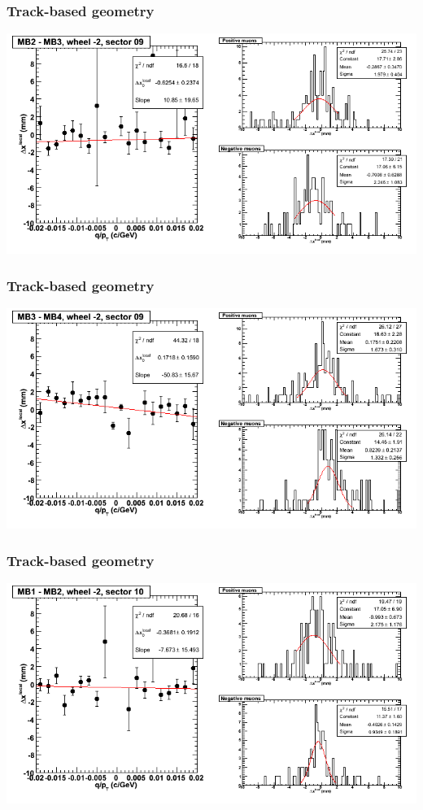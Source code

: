 \documentclass[compress]{beamer}
\begin{document}
\begin{frame}
\frametitle{Track-based geometry}
\includegraphics[width=\linewidth]{NOV4_segdiffs/dt13_resid_A_09_23.png}
\end{frame}

\begin{frame}
\frametitle{Track-based geometry}
\includegraphics[width=\linewidth]{NOV4_segdiffs/dt13_resid_A_09_34.png}
\end{frame}

\begin{frame}
\frametitle{Track-based geometry}
\includegraphics[width=\linewidth]{NOV4_segdiffs/dt13_resid_A_10_12.png}
\end{frame}
\end{document}

